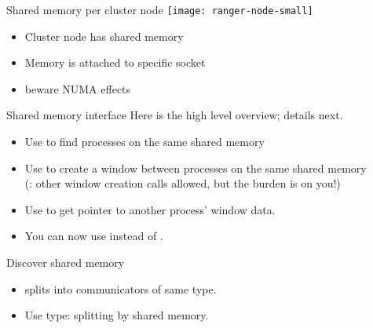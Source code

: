 \begin{numberedframe}{Shared memory per cluster node}
  \texttt{[image: ranger-node-small]}
  \begin{itemize}
  \item Cluster node has shared memory
  \item Memory is attached to specific socket
  \item beware \ac{NUMA} effects
  \end{itemize}
\end{numberedframe}

\begin{numberedframe}{Shared memory interface}
  Here is the high level overview; details next.
  \begin{itemize}
  \item Use  to find processes on the same
    shared memory
  \item Use  to create a window between
    processes on the same shared memory\\
    (: other window creation calls allowed, but the burden is on you!)
  \item Use  to get pointer to another
    process' window data.
  \item You can now use  instead of .
  \end{itemize}
\end{numberedframe}

\begin{numberedframe}{Discover shared memory}
  \begin{itemize}
  \item
     splits into communicators of same type.
  \item Use type:  splitting by
    shared memory.
  \end{itemize}

  { 
    \renewcommand\snippetcodefraction{.4}
    \renewcommand\snippetanswfraction{.55}
    \let\snippetoutputsize\scriptsize
    }
\end{numberedframe}

\begin{exerciseframe}[shareddata]
  
\end{exerciseframe}

